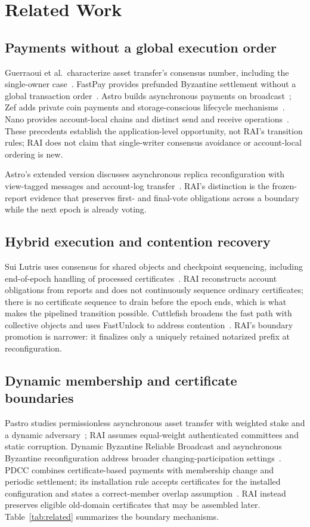 \section{Related Work}
\label{sec:related}
\subsection{Payments without a global execution order}
Guerraoui et al.\ characterize asset transfer's consensus number, including the single-owner case~\cite{consensusnumber}. FastPay provides prefunded Byzantine settlement without a global transaction order~\cite{fastpay}. Astro builds asynchronous payments on broadcast~\cite{astro}; Zef adds private coin payments and storage-conscious lifecycle mechanisms~\cite{zef}. Nano provides account-local chains and distinct send and receive operations~\cite{nano}. These precedents establish the application-level opportunity, not RAI's transition rules; RAI does not claim that single-writer consensus avoidance or account-local ordering is new.

Astro's extended version discusses asynchronous replica reconfiguration with view-tagged messages and account-log transfer~\cite{astro,dbrb}. RAI's distinction is the frozen-report evidence that preserves first- and final-vote obligations across a boundary while the next epoch is already voting.

\subsection{Hybrid execution and contention recovery}
Sui Lutris uses consensus for shared objects and checkpoint sequencing, including end-of-epoch handling of processed certificates~\cite{lutris}. RAI reconstructs account obligations from reports and does not continuously sequence ordinary certificates; there is no certificate sequence to drain before the epoch ends, which is what makes the pipelined transition possible. Cuttlefish broadens the fast path with collective objects and uses FastUnlock to address contention~\cite{cuttlefish}. RAI's boundary promotion is narrower: it finalizes only a uniquely retained notarized prefix at reconfiguration.

\subsection{Dynamic membership and certificate boundaries}
Pastro studies permissionless asynchronous asset transfer with weighted stake and a dynamic adversary~\cite{pastro}; RAI assumes equal-weight authenticated committees and static corruption. Dynamic Byzantine Reliable Broadcast and asynchronous Byzantine reconfiguration address broader changing-participation settings~\cite{dbrb,reconfiguration}. PDCC combines certificate-based payments with membership change and periodic settlement; its installation rule accepts certificates for the installed configuration and states a correct-member overlap assumption~\cite{pdcc}. RAI instead preserves eligible old-domain certificates that may be assembled later. Table~\ref{tab:related} summarizes the boundary mechanisms.

